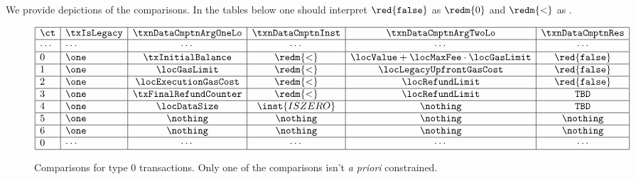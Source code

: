 \def\rFaux{\red{\texttt{false}}}
\def\rZero{\redm{0}}
\def\locLT{\redm{<}}
We provide depictions of the comparisons. In the tables below one should interpret 
$\rFaux$ as $\rZero$ and
$\locLT$ as .
\renewcommand{\arraystretch}{1.3}
\begin{figure}[!h]
	\[
		\begin{array}{|l|l|c|c|c|c|c|c|} \hline
			\ct    & \txIsLegacy & \txnDataCmptnArgOneLo & \txnDataCmptnInst & \txnDataCmptnArgTwoLo                     & \txnDataCmptnRes \\ \hline
			\cdots & \cdots      & \cdots                & \cdots            & \cdots                                    & \cdots           \\ \hline
			0      & \one        & \txInitialBalance     & \locLT            & \locValue + \locMaxFee \cdot \locGasLimit & \rFaux           \\ \hline
			1      & \one        & \locGasLimit          & \locLT            & \locLegacyUpfrontGasCost                  & \rFaux           \\ \hline
			2      & \one        & \locExecutionGasCost  & \locLT            & \locRefundLimit                           & \rFaux           \\ \hline
			3      & \one        & \txFinalRefundCounter & \locLT            & \locRefundLimit                           & \texttt{TBD}     \\ \hline
			4      & \one        & \locDataSize          & \inst{ISZERO}     & \nothing                                  & \texttt{TBD}     \\ \hline
			5      & \one        & \nothing              & \nothing          & \nothing                                  & \nothing         \\ \hline
			6      & \one        & \nothing              & \nothing          & \nothing                                  & \nothing         \\ \hline
			0      & \cdots      & \cdots                & \cdots            & \cdots                                    & \cdots           \\ \hline
		\end{array}                                                                                                                 
	\]                                                                                                                          
	\caption{%
		Comparisons for type 0 transactions. \saNote{} Only one of the comparisons isn't \emph{a priori} constrained.}                                                                                                              
\end{figure}                                                                                                                

